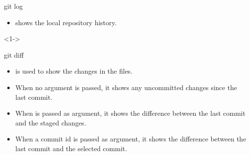 \begin{frame}[fragile]{git log}
    \begin{itemize} 
        \item {} shows the local repository history. 
    \end{itemize}
    \begin{shellblock}<1->{
}\end{shellblock}
\end{frame}

\begin{frame}[fragile]{git diff}
    \begin{itemize} 
        \item {} is used to show the changes in the files.
        \item When no argument is passed, it shows any uncommitted changes since the last commit.
        \item When  is passed as argument, it shows the difference between the last commit and the staged changes.
        \item When a commit id is passed as argument, it shows the difference between the last commit and the selected commit.
    \end{itemize}      		       
\end{frame}
